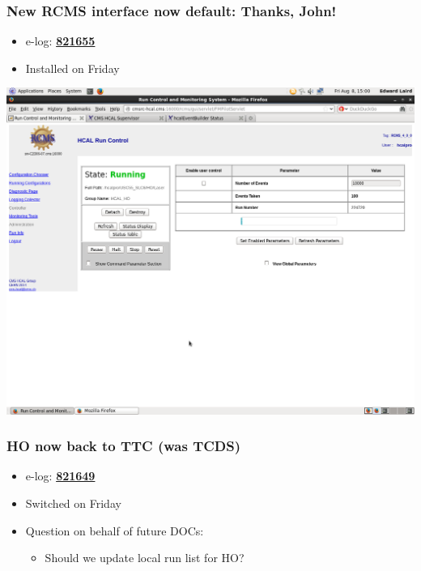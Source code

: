 \documentclass[bigger]{beamer}
\providecommand{\alert}[1]{\textbf{#1}}
\begin{document}
\begin{frame}
\frametitle{New RCMS interface now default: Thanks, John!}
\label{sec-2-1-4}
\begin{itemize}

\item e-log: \href{http://cmsonline.cern.ch/cms-elog/821655}{\alert{821655}}
\label{sec-2-1-4-1}%

\item Installed on Friday
\label{sec-2-1-4-2}%
\end{itemize} %
\label{sec-2-1-4-3}

\centering
\includegraphics[width=.9\linewidth]{fig/running.png}
\end{frame}
\begin{frame}
\frametitle{HO now back to TTC (was TCDS)}
\label{sec-2-1-5}
\begin{itemize}

\item e-log: \href{http://cmsonline.cern.ch/cms-elog/821649}{\alert{821649}}
\label{sec-2-1-5-1}%

\item Switched on Friday
\label{sec-2-1-5-2}%

\item Question on behalf of future DOCs:
\label{sec-2-1-5-3}%
\begin{itemize}

\item Should we update local run list for HO?
\label{sec-2-1-5-3-1}%
\end{itemize} %
\end{itemize} %
\end{frame}
\end{document}
